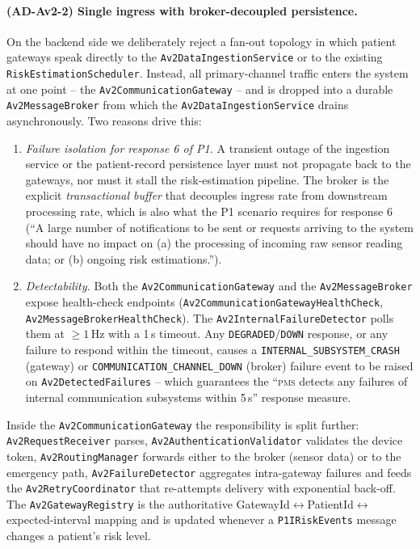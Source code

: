 \paragraph{(AD-Av2-2) Single ingress with broker-decoupled persistence.}
On the backend side we deliberately reject a fan-out topology in which
patient gateways speak directly to the \texttt{Av2DataIngestionService} or
to the existing \texttt{RiskEstimationScheduler}. Instead, all
primary-channel traffic enters the system at one point -- the
\texttt{Av2CommunicationGateway} -- and is dropped into a durable
\texttt{Av2MessageBroker} from which the \texttt{Av2DataIngestionService}
drains asynchronously. Two reasons drive this:
\begin{enumerate}
  \item \emph{Failure isolation for response 6 of P1.} A transient outage
        of the ingestion service or the patient-record persistence layer
        must not propagate back to the gateways, nor must it stall the
        risk-estimation pipeline. The broker is the explicit
        \emph{transactional buffer} that decouples ingress rate from
        downstream processing rate, which is also what the P1 scenario
        requires for response 6 (``A large number of notifications to be
        sent or requests arriving to the system should have no impact on
        (a) the processing of incoming raw sensor reading data; or (b)
        ongoing risk estimations.'').
  \item \emph{Detectability.} Both the \texttt{Av2CommunicationGateway}
        and the \texttt{Av2MessageBroker} expose health-check endpoints
        (\texttt{Av2CommunicationGatewayHealthCheck},
        \texttt{Av2MessageBrokerHealthCheck}). The
        \texttt{Av2InternalFailureDetector} polls them at $\geq 1$\,Hz
        with a 1\,s timeout. Any \texttt{DEGRADED}/\texttt{DOWN} response,
        or any failure to respond within the timeout, causes a
        \texttt{INTERNAL\_SUBSYSTEM\_CRASH} (gateway) or
        \texttt{COMMUNICATION\_CHANNEL\_DOWN} (broker) failure event to be
        raised on \texttt{Av2DetectedFailures} -- which guarantees the
        ``\textsc{pms} detects any failures of internal communication
        subsystems within 5\,s'' response measure.
\end{enumerate}
Inside the \texttt{Av2CommunicationGateway} the responsibility is split
further: \texttt{Av2RequestReceiver} parses,
\texttt{Av2AuthenticationValidator} validates the device token,
\texttt{Av2RoutingManager} forwards either to the broker (sensor data) or
to the emergency path, \texttt{Av2FailureDetector} aggregates
intra-gateway failures and feeds the \texttt{Av2RetryCoordinator} that
re-attempts delivery with exponential back-off. The
\texttt{Av2GatewayRegistry} is the authoritative
\textsf{GatewayId}$\leftrightarrow$\textsf{PatientId}$\leftrightarrow$
expected-interval mapping and is updated whenever a
\texttt{P1IRiskEvents} message changes a patient's risk level.

